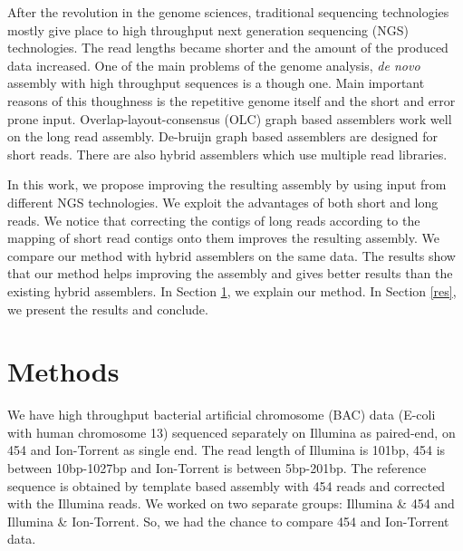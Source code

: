 \documentclass[12pt]{article}
\begin{document}
After the revolution in the genome sciences, traditional sequencing technologies mostly give place to high throughput next generation sequencing (NGS) technologies. The read lengths became shorter and the amount of the produced data increased. One of the main problems of the genome analysis, \textit{de novo} assembly with high throughput sequences is a though one. Main important reasons of this thoughness is the repetitive genome itself and the short and error prone input.
Overlap-layout-consensus (OLC) graph based assemblers\cite{celera:2000, sga:2012} work well on the long read assembly. De-bruijn graph based assemblers\cite{velvetZerbino:2008, spadesBankevich:2012} are designed for short reads. There are also hybrid assemblers\cite{cabogMiller:2008,masurcaZimin:2013} which use multiple read libraries. 

In this work, we propose improving the resulting assembly by using input from different NGS technologies. We exploit the advantages of both short and long reads. We notice that correcting the contigs of long reads according to the mapping of short read contigs onto them improves the resulting assembly. 
We compare our method with hybrid assemblers on the same data. The results show that our method helps improving the assembly and gives better results than the existing hybrid assemblers. In Section \ref{meth}, we explain our method. In Section \ref{res}, we present the results and conclude.

\section{Methods}
\label{meth}

We have high throughput bacterial artificial chromosome (BAC) data (E-coli with human chromosome 13) sequenced separately on Illumina as paired-end, on 454 and Ion-Torrent as single end. The read length of Illumina is 101bp, 454 is between 10bp-1027bp and Ion-Torrent is between 5bp-201bp.
The reference sequence is obtained by template based assembly\cite{mira} with 454 reads and corrected with the Illumina reads.
We worked on two separate groups: Illumina \& 454 and Illumina \& Ion-Torrent. So, we had the chance to compare 454 and Ion-Torrent data.
\end{document}

